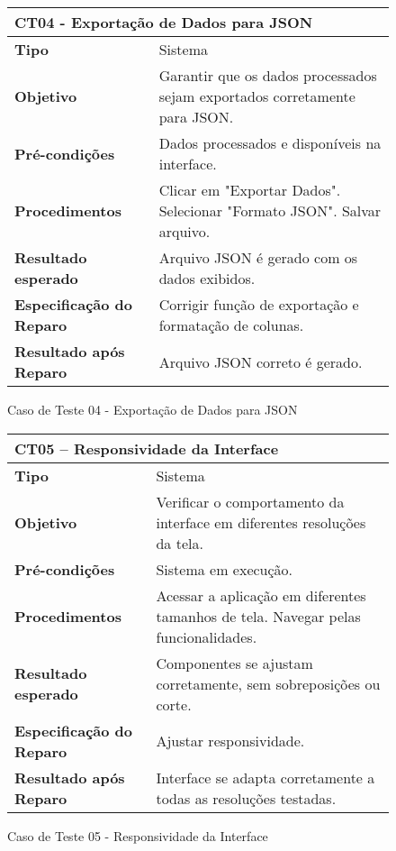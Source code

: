 \begin{figure}[H]
    \centering
\begin{longtable}{|p{}|p{}|}
\hline
\multicolumn{2}{|l|}{\textbf{CT04 - Exportação de Dados para JSON}} \\
\hline
\textbf{Tipo} & Sistema \\
\hline
\textbf{Objetivo} & Garantir que os dados processados sejam exportados corretamente para JSON. \\
\hline
\textbf{Pré-condições} & Dados processados e disponíveis na interface. \\
\hline
\textbf{Procedimentos} & Clicar em "Exportar Dados".  Selecionar "Formato JSON".  Salvar arquivo.  \\
\hline
\textbf{Resultado esperado} & Arquivo JSON é gerado com os dados exibidos. \\
\hline
\textbf{Especificação do Reparo} & Corrigir função de exportação e formatação de colunas. \\
\hline
\textbf{Resultado após Reparo} & Arquivo JSON correto é gerado. \\
\hline
\end{longtable}
\caption{Caso de Teste 04 - Exportação de Dados para JSON}
\label{fig_ct05_exportacao_dados_csv}
\end{figure}

\begin{figure}[H]
    \centering
\begin{longtable}{|p{}|p{}|}
\hline
\multicolumn{2}{|l|}{\textbf{CT05 – Responsividade da Interface}} \\
\hline
\textbf{Tipo} & Sistema \\
\hline
\textbf{Objetivo} & Verificar o comportamento da interface em diferentes resoluções da tela. \\
\hline
\textbf{Pré-condições} & Sistema em execução. \\
\hline
\textbf{Procedimentos} & Acessar a aplicação em diferentes tamanhos de tela. Navegar pelas funcionalidades. \\
\hline
\textbf{Resultado esperado} & Componentes se ajustam corretamente, sem sobreposições ou corte. \\
\hline
\textbf{Especificação do Reparo} & Ajustar responsividade. \\
\hline
\textbf{Resultado após Reparo} & Interface se adapta corretamente a todas as resoluções testadas. \\
\hline
\end{longtable}
\caption{Caso de Teste 05 - Responsividade da Interface}
\label{fig_ct06_responsividade_interface}
\end{figure}

